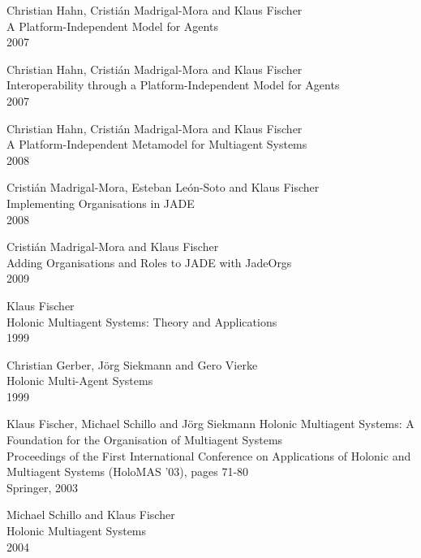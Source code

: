 \begin{thebibliography}{99}
Christian Hahn, Cristián Madrigal-Mora and Klaus Fischer\\
A Platform-Independent Model for Agents\\
2007

Christian Hahn, Cristián Madrigal-Mora and Klaus Fischer\\
Interoperability through a Platform-Independent Model for Agents\\
2007

Christian Hahn, Cristián Madrigal-Mora and Klaus Fischer\\
A Platform-Independent Metamodel for Multiagent Systems\\
2008

Cristián Madrigal-Mora, Esteban León-Soto and Klaus Fischer\\
Implementing Organisations in JADE\\
2008

Cristián Madrigal-Mora and Klaus Fischer\\
Adding Organisations and Roles to JADE with JadeOrgs\\
2009


Klaus Fischer\\
Holonic Multiagent Systems: Theory and Applications\\
1999

Christian Gerber, J\"{o}rg Siekmann and Gero Vierke\\
Holonic Multi-Agent Systems\\
1999

Klaus Fischer, Michael Schillo and J\"{o}rg Siekmann
Holonic Multiagent Systems: A Foundation for the Organisation of Multiagent Systems\\
Proceedings of the First International Conference on Applications of Holonic and Multiagent Systems (HoloMAS '03), pages 71-80\\
Springer, 2003

Michael Schillo and Klaus Fischer\\
Holonic Multiagent Systems\\
2004



\end{thebibliography}
